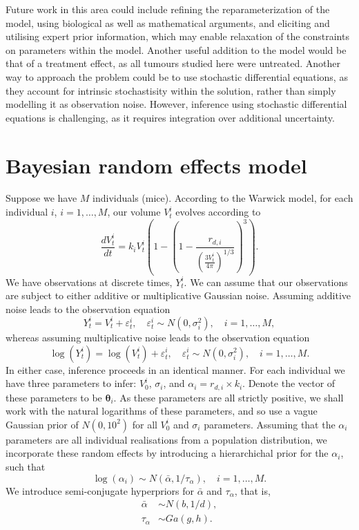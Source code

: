 \documentclass[11pt,a4paper]{article}
\begin{document}
Future work in this area could include refining the reparameterization of the model, using biological as well as mathematical arguments, and eliciting and utilising expert prior information, which may enable relaxation of the constraints on parameters within the model. Another useful addition to the model would be that of a treatment effect, as all tumours studied here were untreated. Another way to approach the problem could be to use stochastic differential equations, as they account for intrinsic stochastisity within the solution, rather than simply modelling it as observation noise. However, inference using stochastic differential equations is challenging, as it requires integration over additional uncertainty.

\appendix

\section{Bayesian random effects model}
\label{appendix}

Suppose we have $M$ individuals (mice). According to the Warwick model, for each individual $i$, $i=1,\ldots, M$, our volume $V_t^i$ evolves according to
\[
\frac{dV_t^i}{dt} = k_iV_t^i\left(1-\left(1-\frac{r_{d,i}}{\left(\frac{3V_t^i}{4 \pi} \right)^{1/3}}\right)^3\right).
\] 
We have observations at discrete times, $Y_t^i$. We can assume that our observations are subject to either additive or multiplicative Gaussian noise. Assuming additive noise leads to the observation equation
\[
Y_t^i = V_t^i + \varepsilon_t^i, \quad \varepsilon_t^i \sim N(0, \sigma_i^2), \quad i = 1, \ldots, M,
\]
whereas assuming multiplicative noise leads to the observation equation
\[
\log(Y_t^i) = \log(V_t^i) + \varepsilon_t^i, \quad \varepsilon_t^i \sim N(0, \sigma_i^2), \quad i = 1, \ldots, M.
\]
In either case, inference proceeds in an identical manner. For each individual we have three parameters to infer: $V_0^i$, $\sigma_i$, and $\alpha_i = r_{d,i} \times k_i$. Denote the vector of these parameters to be $\boldsymbol{\theta}_i$. As these parameters are all strictly positive, we shall work with the natural logarithms of these parameters, and so use a vague Gaussian prior of $N(0, 10^2)$ for all $V_0^i$ and $\sigma_i$ parameters. Assuming that the $\alpha_i$ parameters are all individual realisations from a population distribution, we incorporate these random effects by introducing a hierarchichal prior for the $\alpha_i$, such that
\[
\log(\alpha_i) \sim N(\bar{\alpha}, 1/\tau_\alpha), \quad i = 1, \ldots, M.
\]
We introduce semi-conjugate hyperpriors for $\bar{\alpha}$ and $\tau_\alpha$, that is,
\begin{align*}
\bar{\alpha} & \sim N(b, 1/d), \\
\tau_\alpha & \sim Ga(g,h). \\
\end{align*}
\end{document}
